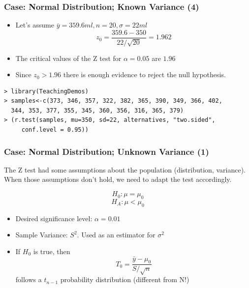 \documentclass[10pt]{beamer}
\begin{document}
\begin{frame}
  \frametitle{Case: Normal Distribution; Known Variance (4)}
  \begin{itemize}
    \item Let's assume $\bar{y} = 359.6ml, n = 20, \sigma = 22ml$\\

      \begin{equation*}
        z_0 = \frac{359.6 - 350}{22/\sqrt{20}} = 1.962
      \end{equation*}
      \bigskip

    \item The critical values of the Z test for $\alpha = 0.05$ are $1.96$

    \item Since $z_0 > 1.96$ there is enough evidence to reject the
      null hypothesis.
  \end{itemize}
\begin{block}{}
{\smaller
\begin{verbatim}
> library(TeachingDemos)
> samples<-c(373, 346, 357, 322, 382, 365, 390, 349, 366, 402, 
  344, 353, 377, 355, 345, 360, 356, 316, 365, 379)
> (r.test(samples, mu=350, sd=22, alternatives, "two.sided",
     conf.level = 0.95))
\end{verbatim}}
\end{block}
\end{frame}

\begin{frame}
  \frametitle{Case: Normal Distribution; Unknown Variance (1)}
  \begin{block}{}
    The Z test had some assumptions about the population
    (distribution, variance). When those assumptions don't hold, we
    need to adapt the test accordingly.
  \end{block}
  
  \begin{equation*}
    H_0 : \mu = \mu_0
  \end{equation*}
  \begin{equation*}
    H_A : \mu < \mu_0
  \end{equation*}
  
  \begin{itemize}
    \item Desired significance level: $\alpha = 0.01$
    \item Sample Variance: $S^2$. Used as an estimator for $\sigma^2$
    \item If $H_0$ is true, then
      \begin{equation*}
        T_0 = \frac{\bar{y} - \mu_0}{S/\sqrt{n}}
      \end{equation*}
      follows a $t_{n-1}$ probability distribution (different from N!)   
  \end{itemize}
\end{frame}
\end{document}
